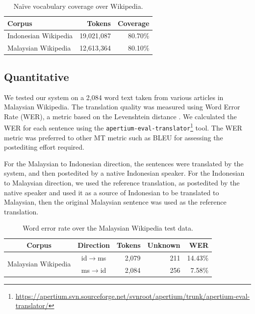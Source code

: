 \documentclass[10pt,a5paper,twoside]{article}
\begin{document}
\begin{table}[htbp]
  \begin{center}
  \begin{tabular}{lrr}
  \toprule
  Corpus & Tokens & Coverage\\
  \midrule
  Indonesian Wikipedia & 19,021,087 & 80.70\% \\
  \midrule
  Malaysian Wikipedia & 12,613,364 & 80.10\% \\
  \bottomrule
  \end{tabular}
  \caption{Na\"ive vocabulary coverage over Wikipedia.}
  \label{table:coverage}
  \end{center}
\end{table}

\subsection{Quantitative}
We tested our system on a 2,084 word text taken from various articles in Malaysian Wikipedia. The translation quality was measured using Word Error Rate (WER), a metric based on the Levenshtein distance \citep{levenshtein/1966}. We calculated the WER for each sentence using the \texttt{\small{apertium-eval-translator}}\footnote{\url{https://apertium.svn.sourceforge.net/svnroot/apertium/trunk/apertium-eval-translator/}} tool. The WER metric was preferred to other MT metric such as BLEU \citep{Papineni2002bleu} for assessing the postediting effort required.

For the Malaysian to Indonesian direction, the sentences were translated by the system, and then postedited by a native Indonesian speaker. For the Indonesian to Malaysian direction, we used the reference translation, as postedited by the native speaker and used it as a source of Indonesian to be translated to Malaysian, then the original Malaysian sentence was used as the reference translation.

\begin{table}[htbp]
  \begin{center}
  \begin{tabular}{ccrrr}
  \toprule
  Corpus                 & Direction         & Tokens  & Unknown & WER  \\
  \midrule
  \multirow{2}{*}{Malaysian Wikipedia} & id$\rightarrow$ms & 2,079     & 211  & 14.43\% \\
                          & ms$\rightarrow$id & 2,084     & 256  & 7.58\%  \\
  \bottomrule
  \end{tabular}
    \caption{Word error rate over the Malaysian Wikipedia test data.}
    \label{table:wer}
  \end{center}
\end{table}
\end{document}
